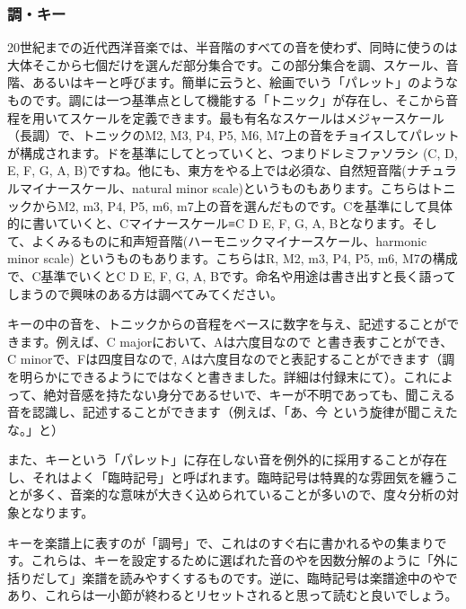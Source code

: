 \documentclass[11pt]{ltjarticle}
\begin{document}
\subsubsection{調・キー}
20世紀までの近代西洋音楽では、半音階のすべての音を使わず、同時に使うのは大体そこから七個だけを選んだ部分集合です。この部分集合を調、スケール、音階、あるいはキーと呼びます。簡単に云うと、絵画でいう「パレット」のようなものです。調には一つ基準点として機能する「トニック」が存在し、そこから音程を用いてスケールを定義できます。最も有名なスケールはメジャースケール（長調）で、トニックのM2, M3, P4, P5, M6, M7上の音をチョイスしてパレットが構成されます。ドを基準にしてとっていくと、つまりドレミファソラシ (C, D, E, F, G, A, B)ですね。他にも、東方をやる上では必須な、自然短音階(ナチュラルマイナースケール、natural minor scale)というものもあります。こちらはトニックからM2, m3, P4, P5, m6, m7上の音を選んだものです。Cを基準にして具体的に書いていくと、Cマイナースケール≡C D E\fl , F, G, A\fl , B\fl となります。そして、よくみるものに和声短音階(ハーモニックマイナースケール、harmonic minor scale) というものもあります。こちらはR, M2, m3, P4, P5, m6, M7の構成で、C基準でいくとC D E\fl , F, G, A\fl , B\na です。命名や用途は書き出すと長く語ってしまうので興味のある方は調べてみてください。\par 
キーの中の音を、トニックからの音程をベースに数字を与え、記述することができます。例えば、C majorにおいて、Aは六度目なので と書き表すことができ、C minorで、Fは四度目なので, A\fl は六度目なので\fl {}と表記することができます（調を明らかにできるようにではなくと書きました。詳細は付録末にて）。これによって、絶対音感を持たない身分であるせいで、キーが不明であっても、聞こえる音を認識し、記述することができます（例えば、「あ、今\na {}  という旋律が聞こえたな。」と）\par
また、キーという「パレット」に存在しない音を例外的に採用することが存在し、それはよく「臨時記号」と呼ばれます。臨時記号は特異的な雰囲気を纏うことが多く、音楽的な意味が大きく込められていることが多いので、度々分析の対象となります。\par
キーを楽譜上に表すのが「調号」で、これは\trebleclef \bassclef のすぐ右に書かれる\sh や\fl の集まりです。これらは、キーを設定するために選ばれた音の\sh や\fl を因数分解のように「外に括りだして」楽譜を読みやすくするものです。逆に、臨時記号は楽譜途中の\sh や\fl であり、これらは一小節が終わるとリセットされると思って読むと良いでしょう。
\end{document}
